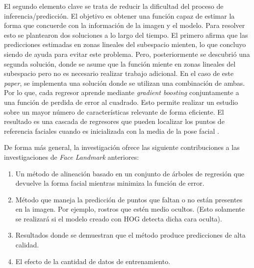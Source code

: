 El segundo elemento clave se trata de reducir la dificultad del proceso de inferencia/predicción. El objetivo es obtener una función capaz de estimar la forma que concuerde con la información de la imagen y el modelo. 
Para resolver esto se plantearon dos soluciones a lo largo del tiempo. El primero afirma que las predicciones estimadas en zonas lineales del subespacio mienten, lo que concluyo siendo de ayuda para evitar este problema. Pero, posteriormente se descubrió una segunda solución, donde se asume que la función miente en zonas lineales del subespacio pero no es necesario realizar trabajo adicional. En el caso de este \textit{paper}, se implementa una solución donde se utilizan una combinación de ambas. Por lo que, cada regresor aprende mediante \textit{gradient boosting} conjuntamente a una función de perdida de error al cuadrado.
Esto permite realizar un estudio sobre un mayor número de características relevante de forma eficiente. El resultado es una cascada de regresores que pueden localizar los puntos de referencia faciales cuando es inicializada con la media de la pose facial \cite{faceLandmark}.

\newpage
De forma más general, la investigación ofrece las siguiente contribuciones a las investigaciones de \textit{Face Landmark} anteriores:

\begin{enumerate}
	\vspace{-0.2cm}
	\item Un método de alineación basado en un conjunto de árboles de regresión que devuelve la forma facial mientras minimiza la función de error.
	\vspace{-0.2cm}
	\item Método que maneja la predicción de puntos que faltan o no están presentes en la imagen. Por ejemplo, rostros que estén medio ocultos. (Esto solamente se realizará si el modelo creado con HOG detecta dicha cara oculta).
	\vspace{-0.2cm}
	\item Resultados donde se demuestran que el método produce predicciones de alta calidad.
	\vspace{-0.2cm}
	\item El efecto de la cantidad de datos de entrenamiento.
\end{enumerate}

